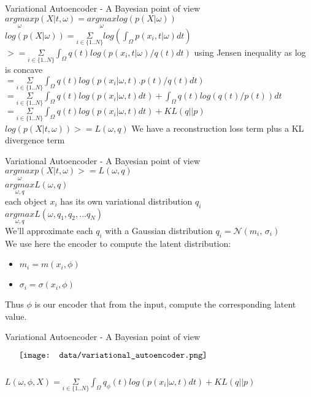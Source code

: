 \documentclass{beamer}
\begin{document}
\begin{frame}{Variational Autoencoder - A Bayesian point of view}
	$\underset{\omega}{argmax} p(X|t, \omega) = \underset{\omega}{argmax} log(p(X| \omega))$ \\
	$ log(p(X| \omega)) = \underset{i \in \{1..N\}}{\Sigma} log( \int_\Omega p(x_i, t | \omega) dt)$ \\ 
	$ >= \underset{i \in \{1..N\}}{\Sigma} \int_\Omega q(t) log( p(x_i, t | \omega)/q(t) dt)$ using Jensen inequality as log is concave\\
	$ = \underset{i \in \{1..N\}}{\Sigma} \int_\Omega q(t) log( p(x_i | \omega, t).p(t)/q(t) dt)$ \\
	$ = \underset{i \in \{1..N\}}{\Sigma} \int_\Omega q(t) log( p(x_i | \omega, t) dt) + \int_\Omega q(t)log(q(t)/p(t)) dt$ \\
	$ = \underset{i \in \{1..N\}}{\Sigma} \int_\Omega q(t) log( p(x_i | \omega, t) dt) + KL( q || p) $ \\
	$ log(p(X|t, \omega)) >= L(\omega,q) $
	We have a reconstruction loss term plus a KL divergence term
\end{frame}

\begin{frame}{Variational Autoencoder - A Bayesian point of view}
	$ \underset{\omega}{argmax} p(X|t, \omega) >= L(\omega,q) $ \\
        $ \underset{\omega,q}{argmax} L(\omega,q) $ \\
	each object $x_i$ has its own variational distribution $q_i$ \\
        $ \underset{\omega,q}{argmax} L(\omega,q_1, q_2, ... q_N) $ \\
	We'll approximate each $q_i$ with a Gaussian distribution $q_i = \mathcal{N}(m_i,\,\sigma_i)$ \\
	We use here the encoder to compute the latent distribution: \\
	\begin{itemize}
		\item $m_i = m(x_i, \phi)$
		\item $\sigma_i = \sigma(x_i, \phi)$
	\end{itemize}
	Thus $\phi$ is our encoder that from the input, compute the corresponding latent value.
\end{frame}

\begin{frame}{Variational Autoencoder - A Bayesian point of view}
    \begin{minipage}{6in}
    \centering
    $\vcenter{
    \texttt{[image: data/variational\_autoencoder.png]} \\
    }$
    \end{minipage}
    $ L(\omega, \phi, X)= \underset{i \in \{1..N\}}{\Sigma} \int_\Omega q_\phi(t) log( p(x_i | \omega, t) dt) + KL( q || p ) $
\end{frame}
\end{document}
